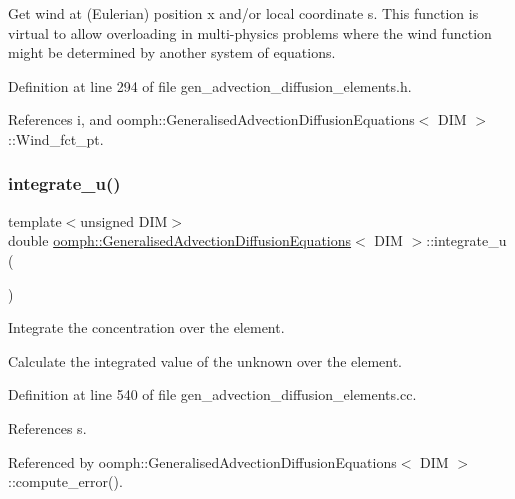 Get wind at (Eulerian) position x and/or local coordinate s. This function is virtual to allow overloading in multi-\/physics problems where the wind function might be determined by another system of equations. 



Definition at line 294 of file gen\+\_\+advection\+\_\+diffusion\+\_\+elements.\+h.



References i, and oomph\+::\+Generalised\+Advection\+Diffusion\+Equations$<$ D\+I\+M $>$\+::\+Wind\+\_\+fct\+\_\+pt.

\mbox{\label{classoomph_1_1GeneralisedAdvectionDiffusionEquations_ad4651d1bd8d4da68f5d3d5acb45f659b}} 
\subsubsection{\texorpdfstring{integrate\+\_\+u()}{integrate\_u()}}
{\footnotesize\ttfamily template$<$unsigned D\+IM$>$ \\
double \hyperlink{classoomph_1_1GeneralisedAdvectionDiffusionEquations}{oomph\+::\+Generalised\+Advection\+Diffusion\+Equations}$<$ D\+IM $>$\+::integrate\+\_\+u (\begin{DoxyParamCaption}{ }\end{DoxyParamCaption})}



Integrate the concentration over the element. 

Calculate the integrated value of the unknown over the element. 

Definition at line 540 of file gen\+\_\+advection\+\_\+diffusion\+\_\+elements.\+cc.



References s.



Referenced by oomph\+::\+Generalised\+Advection\+Diffusion\+Equations$<$ D\+I\+M $>$\+::compute\+\_\+error().

\mbox{\label{classoomph_1_1GeneralisedAdvectionDiffusionEquations_af71ceecd19ee6ea4e8978b9441fb1d42}} 
